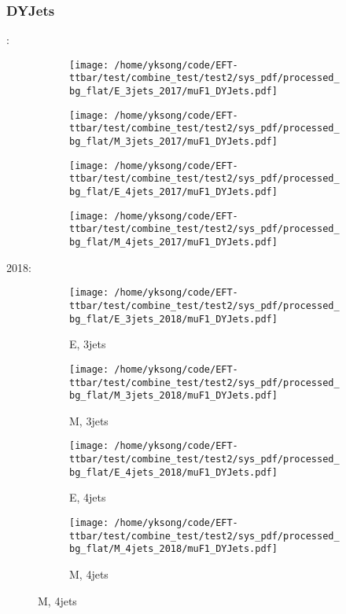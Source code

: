 \documentclass{beamer}
\begin{document}
\begin{frame}
\frametitle{DYJets}
\fontsize{5}{1}:
\begin{figure}
\centering
\begin{subfigure}[b]{0.24\textwidth}
\texttt{[image: /home/yksong/code/EFT-ttbar/test/combine\_test/test2/sys\_pdf/processed\_bg\_flat/E\_3jets\_2017/muF1\_DYJets.pdf]}
\end{subfigure}
\begin{subfigure}[b]{0.24\textwidth}
\texttt{[image: /home/yksong/code/EFT-ttbar/test/combine\_test/test2/sys\_pdf/processed\_bg\_flat/M\_3jets\_2017/muF1\_DYJets.pdf]}
\end{subfigure}
\begin{subfigure}[b]{0.24\textwidth}
\texttt{[image: /home/yksong/code/EFT-ttbar/test/combine\_test/test2/sys\_pdf/processed\_bg\_flat/E\_4jets\_2017/muF1\_DYJets.pdf]}
\end{subfigure}
\begin{subfigure}[b]{0.24\textwidth}
\texttt{[image: /home/yksong/code/EFT-ttbar/test/combine\_test/test2/sys\_pdf/processed\_bg\_flat/M\_4jets\_2017/muF1\_DYJets.pdf]}
\end{subfigure}
\end{figure}
2018:
\begin{figure}
\centering
\begin{subfigure}[b]{0.24\textwidth}
\texttt{[image: /home/yksong/code/EFT-ttbar/test/combine\_test/test2/sys\_pdf/processed\_bg\_flat/E\_3jets\_2018/muF1\_DYJets.pdf]}
\captionsetup{font=tiny}
\caption{E, 3jets}
\end{subfigure}
\begin{subfigure}[b]{0.24\textwidth}
\texttt{[image: /home/yksong/code/EFT-ttbar/test/combine\_test/test2/sys\_pdf/processed\_bg\_flat/M\_3jets\_2018/muF1\_DYJets.pdf]}
\captionsetup{font=tiny}
\caption{M, 3jets}
\end{subfigure}
\begin{subfigure}[b]{0.24\textwidth}
\texttt{[image: /home/yksong/code/EFT-ttbar/test/combine\_test/test2/sys\_pdf/processed\_bg\_flat/E\_4jets\_2018/muF1\_DYJets.pdf]}
\captionsetup{font=tiny}
\caption{E, 4jets}
\end{subfigure}
\begin{subfigure}[b]{0.24\textwidth}
\texttt{[image: /home/yksong/code/EFT-ttbar/test/combine\_test/test2/sys\_pdf/processed\_bg\_flat/M\_4jets\_2018/muF1\_DYJets.pdf]}
\captionsetup{font=tiny}
\caption{M, 4jets}
\end{subfigure}
\end{figure}
\end{frame}
\end{document}
